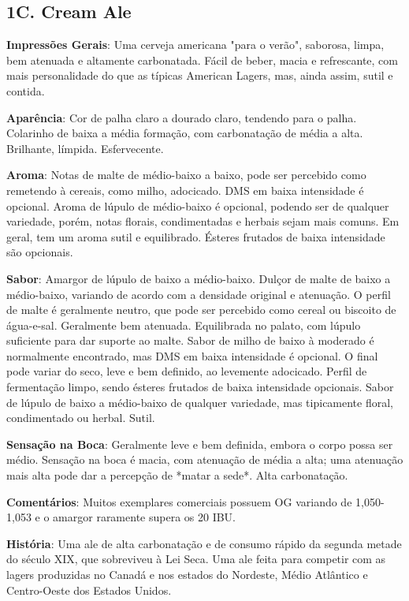 \subsection*{1C. Cream Ale}

\textbf{Impressões Gerais}: Uma cerveja americana "para o verão", saborosa, limpa, bem atenuada e altamente carbonatada. Fácil de beber, macia e refrescante, com mais personalidade do que as típicas American Lagers, mas, ainda assim, sutil e contida.

\textbf{Aparência}: Cor de palha claro a dourado claro, tendendo para o palha. Colarinho de baixa a média formação, com carbonatação de média a alta. Brilhante, límpida. Esfervecente.

\textbf{Aroma}: Notas de malte de médio-baixo a baixo, pode ser percebido como remetendo à cereais, como milho, adocicado. DMS em baixa intensidade é opcional. Aroma de lúpulo de médio-baixo é opcional, podendo ser de qualquer variedade, porém, notas florais, condimentadas e herbais sejam mais comuns. Em geral, tem um aroma sutil e equilibrado. Ésteres frutados de baixa intensidade são opcionais.

\textbf{Sabor}: Amargor de lúpulo de baixo a médio-baixo. Dulçor de malte de baixo a médio-baixo, variando de acordo com a densidade original e atenuação. O perfil de malte é geralmente neutro, que pode ser percebido como cereal ou biscoito de água-e-sal. Geralmente bem atenuada. Equilibrada no palato, com lúpulo suficiente para dar suporte ao malte. Sabor de milho de baixo à moderado é normalmente encontrado, mas DMS em baixa intensidade é opcional. O final pode variar do seco, leve e bem definido, ao levemente adocicado. Perfil de fermentação limpo, sendo ésteres frutados de baixa intensidade opcionais. Sabor de lúpulo de baixo a médio-baixo de qualquer variedade, mas tipicamente floral, condimentado ou herbal. Sutil.

\textbf{Sensação na Boca}: Geralmente leve e bem definida, embora o corpo possa ser médio. Sensação na boca é macia, com atenuação de média a alta; uma atenuação mais alta pode dar a percepção de *matar a sede*. Alta carbonatação.

\textbf{Comentários}: Muitos exemplares comerciais possuem OG variando de 1,050-1,053 e o amargor raramente supera os 20 IBU.

\textbf{História}: Uma ale de alta carbonatação e de consumo rápido da segunda metade do século XIX, que sobreviveu à Lei Seca. Uma ale feita para competir com as lagers produzidas no Canadá e nos estados do Nordeste, Médio Atlântico e Centro-Oeste dos Estados Unidos.

